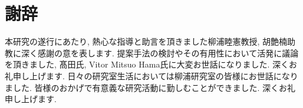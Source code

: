 \chapter*{謝辞}
本研究の遂行にあたり, 熱心な指導と助言を頂きました柳浦睦憲教授, 胡艶楠助教に深く感謝の意を表します.
提案手法の検討やその有用性において活発に議論を頂きました, 髙田氏, Vitor Mitsuo Hama氏に大変お世話になりました. 深くお礼申し上げます.
日々の研究室生活においては柳浦研究室の皆様にお世話になりました.
皆様のおかげで有意義な研究活動に勤しむことができました. 深くお礼申し上げます.
